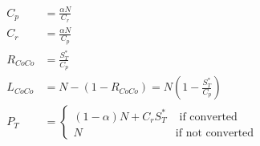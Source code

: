 \begin{align}
    C_p &= \frac{\alpha N}{C_r}\\
    C_r &= \frac{\alpha N}{C_p}\\
    R_{CoCo} &= \frac{S_T^{*} }{C_p}\\
    L_{CoCo} &= N - ( 1 - R_{CoCo}) = N \left( 1 - \frac{S_T^{*}}{C_p} \right)\\
    P_T &= \begin{cases} (1 - \alpha) N + C_r S_T^{*} & \text{ if converted} \\ N & \text{if not converted} \end{cases}
\end{align}

